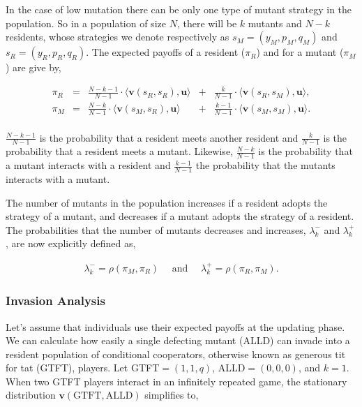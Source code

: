 \documentclass[11pt]{article}
\theoremstyle{plainCl1}
\theoremstyle{plainCl2}
\begin{document}
In the case of low mutation there can be only one type of mutant strategy in the
population. So in a population of size \(N\), there will be \(k\) mutants and
\(N - k\) residents, whose strategies we denote respectively as \(s_M =(y_M,
p_M, q_M)\) and \(s_R = (y_R, p_R, q_R)\).
The expected payoffs of a resident (\(\pi_R\)) and for a
mutant (\(\pi_M\)) are give by,

\begin{equation} \label{Eq:ExpPay}
  \begin{array}{lcrcr}
  \displaystyle \pi_R & = &\displaystyle \frac{N\!-\!k\!-\!1}{N-1}\cdot \langle\mathbf{v}(s_R,s_R),\mathbf{u}\rangle	&+	&\displaystyle\frac{k}{N-1}\cdot \langle\mathbf{v}(s_R,s_M),\mathbf{u}\rangle,\\[0.5cm]
  \displaystyle \pi_M & = &\displaystyle\frac{N-k}{N-1}\cdot \langle\mathbf{v}(s_M,s_R),\mathbf{u}\rangle&+	&\displaystyle\frac{k-1}{N-1}\cdot \langle\mathbf{v}(s_M,s_M),\mathbf{u}\rangle.\\
  \end{array}
\end{equation}

\(\frac{N\!-\!k\!-\!1}{N-1}\) is the probability that a resident meets another
resident and \(\frac{k}{N-1}\) is the probability that a resident meets a
mutant. Likewise, \(\frac{N-k}{N-1}\) is the probability that a mutant interacts
with a resident and \(\frac{k-1}{N-1}\) the probability that the mutants
interacts with a mutant.

The number of mutants in the population increases if a resident adopts the strategy
of a mutant, and decreases if a mutant adopts the strategy of a resident. The
probabilities that the number of mutants decreases and increases,
\(\lambda^-_k\) and \(\lambda^+_k\), are now explicitly defined as,

\begin{align*}
  \lambda^-_k \!=\!\rho(\pi_M, \pi_R) \quad \text{ and } \quad \lambda^+_k \!=\!\rho(\pi_R, \pi_M).
\end{align*}

\subsubsection*{Invasion Analysis}

Let's assume that individuals use their expected payoffs at the updating phase.
We can calculate how easily a single defecting mutant (ALLD) can invade into a
resident population of conditional cooperators, otherwise known as generous tit
for tat (GTFT), players. Let GTFT\(= (1, 1, q)\), ALLD\(= (0, 0, 0)\), and \(k =
1\). When two GTFT players interact in an infinitely repeated game, the
stationary distribution \(\mathbf{v}(\text{GTFT}, \text{ALLD})\) 
simplifies to,
\end{document}
